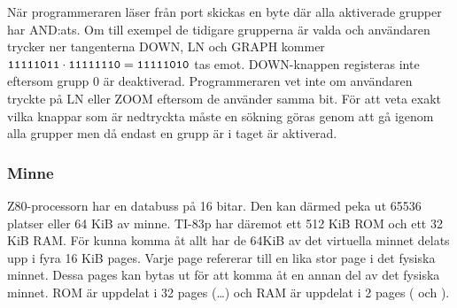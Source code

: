 \documentclass[main.tex]{subfiles}
\begin{document}
När programmeraren läser från port  skickas en byte där alla
aktiverade grupper har AND:ats. Om till exempel de tidigare grupperna är valda
och användaren trycker ner tangenterna DOWN, LN och GRAPH kommer
$\texttt{11111011} \cdot \texttt{11111110} = \texttt{11111010}$ tas emot.
DOWN-knappen registeras inte eftersom grupp 0 är deaktiverad. Programmeraren
vet inte om användaren tryckte på LN eller ZOOM eftersom de använder samma bit.
För att veta exakt vilka knappar som är nedtryckta måste en sökning göras genom
att gå igenom alla grupper men då endast en grupp är i taget är aktiverad.

\subsubsection{Minne}
Z80-processorn har en databuss på 16 bitar. Den kan därmed peka ut 65536
platser eller 64 KiB av minne. TI-83p har däremot ett 512 KiB ROM och ett 32 KiB
RAM. För kunna komma åt allt har de 64KiB av det virtuella minnet delats upp i
fyra 16 KiB pages. Varje page refererar till en lika stor page i det fysiska
minnet. Dessa pages kan bytas ut för att komma åt en annan del av det fysiska
minnet.  ROM är uppdelat i 32 pages (\dots{}) och RAM
är uppdelat i 2 pages ( och ).
\end{document}
